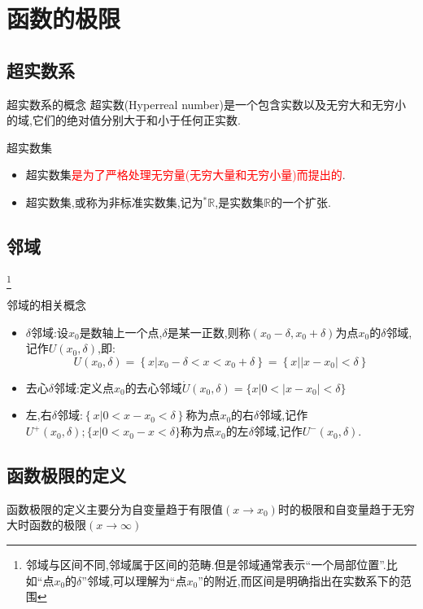 \documentclass[8pt a4paper, oneside, UTF8]{ctexbook}
\begin{document}
\begin{sloppypar}
    \section{函数的极限}
    \subsection{超实数系}
    \begin{defn}{超实数系的概念}{}
        超实数(Hyperreal number)是一个包含实数以及无穷大和无穷小的域,它们的绝对值分别大于和小于任何正实数.
    \end{defn}
    \begin{criterion}{超实数集}{}
        \begin{itemize}
            \item 超实数集\textcolor{red}{是为了严格处理无穷量(无穷大量和无穷小量)而提出的}.
            \item 超实数集,或称为非标准实数集,记为$^{*}\mathbb{R}$,是实数集$\mathbb{R}$的一个扩张.
        \end{itemize}
    \end{criterion}
    \subsection{邻域}\footnote{邻域与区间不同,邻域属于区间的范畴.但是邻域通常表示“一个局部位置”.比如“点$x_0$的$\delta$”邻域,可以理解为“点$x_0$”的附近,而区间是明确指出在实数系下的范围}
    \begin{defn}{邻域的相关概念}{}
        \begin{itemize}
            \item $\delta$邻域:设$x_0$是数轴上一个点,$\delta$是某一正数,则称$(x_{0}-\delta,x_{0}+\delta)$为点$x_0$的$\delta$邻域,记作$U(x_{0},\delta)$,即:
                  $$
                      U(x_{0},\delta)=\left\{x|x_{0}-\delta<x<x_{0}+\delta\right\}=\left\{\left.x\right|\left|\left.x-x_{0}\right|<\delta\right\}\right.
                  $$
            \item 去心$\delta$邻域:定义点$x_0$的去心邻域$\mathring{U}(x_{0},\delta)=\bigl\{x|0<\bigl|x-x_{0}\bigr|<\delta\bigr\}$
            \item 左,右$\delta$邻域:$\left\{x|0<x-x_{0}<\delta\right\}$称为点$x_0$的右$\delta$邻域,记作$U^{+}(x_{0},\delta);\{x|0<x_{0}-x<\delta\}$称为点$x_0$的左$\delta$邻域,记作$U^{-}(x_{0},\delta).$
        \end{itemize}
    \end{defn}
    \subsection{函数极限的定义}
    函数极限的定义主要分为自变量趋于有限值$(x \to x_0)$时的极限和自变量趋于无穷大时函数的极限$(x \to \infty)$

\end{sloppypar}
\end{document}
